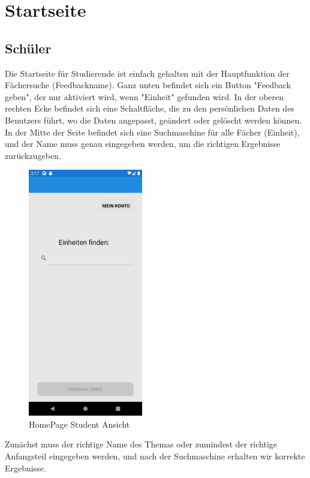 \section{Startseite}
\subsection{Schüler}
Die Startseite für Studierende ist einfach gehalten mit der Hauptfunktion der Fächersuche (Feedbackname). Ganz unten befindet sich ein Button "Feedback geben", der nur aktiviert wird, wenn "Einheit" gefunden wird. In der oberen rechten Ecke befindet sich eine Schaltfläche, die zu den persönlichen Daten des Benutzers führt, wo die Daten angepasst, geändert oder gelöscht werden können. In der Mitte der Seite befindet sich eine Suchmaschine für alle Fächer (Einheit), und der Name muss genau eingegeben werden, um die richtigen Ergebnisse zurückzugeben.
\begin{figure}[h]
    \begin{center}
        \includegraphics*[width=5cm]{pics/Xamarin Student/7 HomePage Student.png}
        \caption[HomePage Student Ansicht]{HomePage Student Ansicht}
    \end{center}
\end{figure}
\newpage
Zunächst muss der richtige Name des Themas oder zumindest der richtige Anfangsteil eingegeben werden, und nach der Suchmaschine erhalten wir korrekte Ergebnisse.

